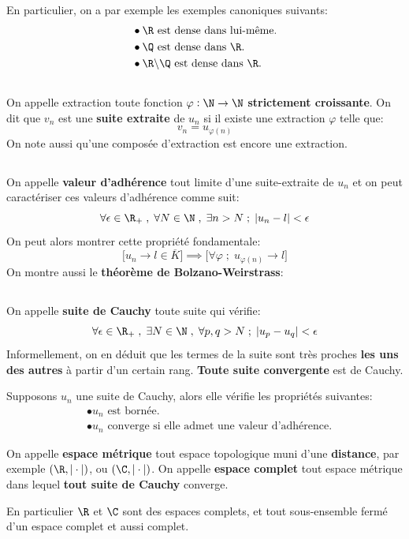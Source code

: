 En particulier, on a par exemple les exemples canoniques suivants:
\begin{align*}
    &\bullet \text{\(\R\) est dense dans lui-même}.\\
    &\bullet \text{\(\Q\) est dense dans \(\R\)}.\\
    &\bullet \text{\(\R \backslash \Q\) est dense dans \(\R\)}.
\end{align*}

\subsection*{}
On appelle extraction toute fonction \(\varphi : \N \rightarrow \N\) \textbf{strictement croissante}.\+
On dit que \(v_n\) est une \textbf{suite extraite} de \(u_n\) si il existe une extraction \(\varphi\) telle que:
\[
    v_n = u_{\varphi(n)}
\]
On note aussi qu'une composée d'extraction est encore une extraction.
\subsection*{}
On appelle \textbf{valeur d'adhérence} tout limite d'une suite-extraite de \(u_n\) et on peut caractériser ces valeurs d'adhérence comme suit:
\[
    \forall \epsilon \in \R_+ \; , \; \forall N \in \N \; , \; \exists n > N \; ; \; |u_n - l| < \epsilon 
\]
On peut alors montrer cette propriété fondamentale:
\[
    \Bigr[u_n \rightarrow l \in \overline{K} \Bigr] \implies \Bigr[ \forall \varphi \; ; \; u_{\varphi(n)} \rightarrow l \Bigr]
\]
On montre aussi le \textbf{théorème de Bolzano-Weirstrass}:
\begin{center}
\end{center}

\subsection*{}
On appelle \textbf{suite de Cauchy} toute suite qui vérifie:
\[
    \forall \epsilon \in \R_+ \; , \; \exists N \in \N \; , \; \forall p, q > N \; ; \; |u_p - u_q| < \epsilon 
\]
Informellement, on en déduit que les termes de la suite sont très proches \textbf{les uns des autres} à partir d'un certain rang.\+
\textbf{Toute suite convergente} est de Cauchy.\<

Supposons \(u_n\) une suite de Cauchy, alors elle vérifie les propriétés suivantes:
\begin{align*}
    &\bullet u_n \text{ est bornée.} \\
    &\bullet u_n \text{ converge si elle admet une valeur d'adhérence.}
\end{align*}

On appelle \textbf{espace métrique} tout espace topologique muni d'une \textbf{distance}, par exemple \((\R, |\cdot|)\), ou \((\C, |\cdot|)\).\+
On appelle \textbf{espace complet} tout espace métrique dans lequel \textbf{tout suite de Cauchy} converge.\<

En particulier \(\R\) et \(\C\) sont des espaces complets, et tout sous-ensemble fermé d'un espace complet et aussi complet. \<

